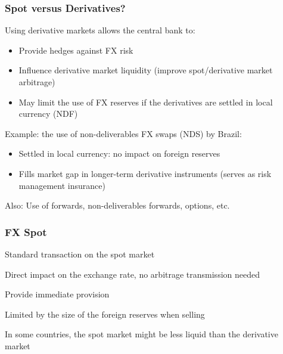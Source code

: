 \documentclass{beamer}
\newenvironment{wideitemize}{\itemize\addtolength{\itemsep}{10pt}}{\enditemize}
\begin{document}
\begin{frame}
  \frametitle{Spot versus Derivatives?}
  \begin{wideitemize}
  \item Using derivative markets allows the central bank to:
    \begin{itemize}
    \item Provide hedges against FX risk
    \item Influence derivative market liquidity (improve spot/derivative market arbitrage)
    \item May limit the use of FX reserves if the derivatives are settled in local currency (NDF)
    \end{itemize}
  \item Example: the use of non-deliverables FX swaps (NDS) by Brazil:
    \begin{itemize}
    \item Settled in local currency: no impact on foreign reserves
    \item Fills market gap in longer-term derivative instruments (serves as risk management insurance)
    \end{itemize}
  \item Also: Use of forwards, non-deliverables forwards, options, etc.
  \end{wideitemize}
\end{frame}

\begin{frame}
  \frametitle{FX Spot}
  \begin{wideitemize}
  \item Standard transaction on the spot market
  \item Direct impact on the exchange rate, no arbitrage transmission needed  
  \item Provide immediate provision
  \item Limited by the size of the foreign reserves when selling
  \item In some countries, the spot market might be less liquid than the derivative market
  \end{wideitemize}
\end{frame}
\end{document}
